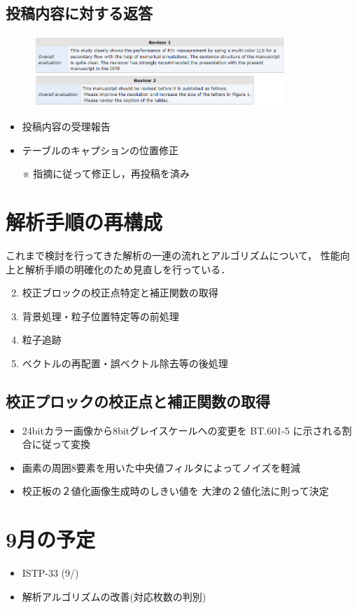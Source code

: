 \documentclass[twocolumn,a4j]{jsarticle}
\begin{document}
\subsection{投稿内容に対する返答}
\begin{figure}[htbp]
  \footnotesize
  \includegraphics[width=95mm]{../images/reviews.png}
\end{figure}

\begin{itemize}
  \item 投稿内容の受理報告
  \item テーブルのキャプションの位置修正
  \item [※] 指摘に従って修正し，再投稿を済み
\end{itemize}

\section{解析手順の再構成}
これまで検討を行ってきた解析の一連の流れとアルゴリズムについて，
性能向上と解析手順の明確化のため見直しを行っている．

\begin{enumerate}[(1)]
  \item [] \textgt{[ 全体の流れ ]}
  \item 校正ブロックの校正点特定と補正関数の取得
  \item 背景処理・粒子位置特定等の前処理
  \item 粒子追跡
  \item ベクトルの再配置・誤ベクトル除去等の後処理
\end{enumerate}

\subsection{校正プロックの校正点と補正関数の取得}
\begin{itemize}
  \item 24bitカラー画像から8bitグレイスケールへの変更を
        BT.601-5 に示される割合に従って変換
  \item 画素の周囲8要素を用いた中央値フィルタによってノイズを軽減
  \item 校正板の２値化画像生成時のしきい値を
        大津の２値化法に則って決定
\end{itemize}





\section{9月の予定}
\begin{itemize}
  \item ISTP-33 (9/)
  \item 解析アルゴリズムの改善(対応枚数の判別)
\end{itemize}
\end{document}
